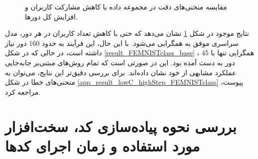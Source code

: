 \begin{figure}[b]
	\centering
	\hspace{0.8mm}
	\caption{
		مقایسه منحنی‌های دقت در مجموعه داده
		با کاهش مشارکت کاربران و افزایش  کل دورها.
	}
	\label{result_lowC_highStep_FEMNISTclass}
\end{figure}


نتایج موجود در شکل
\ref{result_lowC_highStep_FEMNISTclass}
نشان می‌دهد که حتی با کاهش تعداد کاربران در هر دور، مدل سراسری موفق به همگرایی می‌شود. با این حال، این فرآیند به حدود 160 دور نیاز داشته است، در حالی که در شکل
\ref{result_FEMNISTclass_base}%
، همگرایی تنها با 45 دور به دست آمده بود. این در صورتی است که تمام روش‌های مبتنی‌بر جابه‌جایی عملکرد مشابهی از خود نشان داده‌اند. برای بررسی دقیق‌تر این نتایج، می‌توان به منحنی‌های خطا در شکل
\ref{app_result_lowC_highStep_FEMNISTclass}
پیوست، مراجعه کرد.



\section{بررسی نحوه پیاده‌سازی کد، سخت‌افزار مورد استفاده و زمان اجرای کدها}

